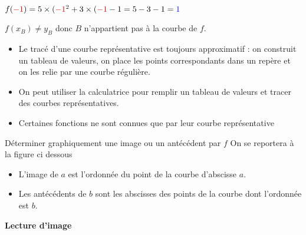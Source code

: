 \begin{pageCours}
\begin{Ex}
\begin{minipage}{0.5\linewidth}
$f({\color{red}-1})=5\times ({\color{red}-1}^2+3\times ({\color{red}-1}-1=5-3-1={\color{blue}1}$ 

$f(x_B)\neq y_B$ donc $B$ n'appartient pas à la courbe de $f$.  
\end{minipage}
\end{Ex}




\begin{Rqs}
\begin{itemize}
\item Le tracé d'une courbe représentative est toujours approximatif : on construit un tableau de valeurs, on place les points correspondants dans un repère et on les relie par une courbe régulière.
\item On peut utiliser la calculatrice pour remplir un tableau de valeurs et tracer des courbes représentatives. 
\item Certaines fonctions ne sont connues que par leur courbe représentative
\end{itemize}
\end{Rqs}




\begin{MtT}{Déterminer graphiquement une image ou un antécédent par $f$}
On se reportera à la figure ci dessous
\begin{itemize}
\item L'image de $a$ est l'ordonnée du point de la courbe d'abscisse $a$.
\item Les antécédents de $b$ sont les abscisses des points de la courbe dont l'ordonnée est $b$.
\end{itemize}

\begin{minipage}{0.48\linewidth}
\textbf{Lecture d'image}


\end{minipage}
\end{MtT}
\end{pageCours}
